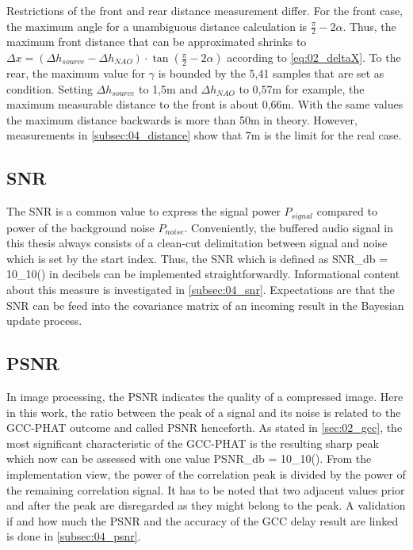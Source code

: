 Restrictions of the front and rear distance measurement differ.
For the front case, the maximum angle for a unambiguous distance calculation
is $\frac{\pi}{2}- 2\alpha$.
Thus, the maximum front distance that can be approximated shrinks to
$\Delta x = (\Delta h_{source} - \Delta h_{NAO}) \cdot \tan(\frac{\pi}{2} - 2\alpha)$
according to \cref{eq:02_deltaX}.
To the rear, the maximum value for $\gamma$ is bounded by the 5,41 samples that
are set as condition.
Setting $\Delta h_{source}$ to 1,5\si{m} and $\Delta h_{NAO}$ to 0,57\si{\meter} for example,
the maximum measurable distance to the front is about 0,66\si{\meter}.
With the same values the maximum distance backwards is more than 50\si{\meter} in theory.
However, measurements in \cref{subsec:04_distance} show that 7\si{\meter} is the
limit for the real case.


\subsection{SNR}
\label{subsec:03_snr}

The \acf{SNR} is a common value to express the signal power $P_{signal}$ compared
to power of the background noise $P_{noise}$.
Conveniently, the buffered audio signal in this thesis always consists of
a clean-cut delimitation between signal and noise which is set by the
start index.
Thus, the \ac{SNR} which is defined as
\bal
    SNR_{db} = 10\log_{10}\left(\right)
    \label{eq:03_snr}
\eal
in decibels can be implemented straightforwardly.
Informational content about this measure is investigated in \cref{subsec:04_snr}.
Expectations are that the \ac{SNR} can be feed into the covariance matrix
of an incoming result in the Bayesian update process.

\subsection{PSNR}
\label{subsec:03_psnr}
In image processing, the \acf{PSNR} indicates the quality of a compressed
image. Here in this work, the ratio between the peak of a signal
and its noise is related to the \ac{GCC-PHAT} outcome and called \ac{PSNR}
henceforth.
As stated in \cref{sec:02_gcc}, the most significant characteristic
of the \ac{GCC-PHAT} is the resulting sharp peak which now can be
assessed with one value
\bal
    PSNR_{db} = 10\log_{10}\left(\right).
    \label{eq:03_psnr}
\eal
From the implementation view, the power of the correlation peak is divided by
the power of the remaining correlation signal.
It has to be noted that two adjacent values prior and after the peak
are disregarded as they might belong to the peak.
A validation if and how much the \ac{PSNR} and the accuracy of the \ac{GCC}
delay result are linked is done in \cref{subsec:04_psnr}.